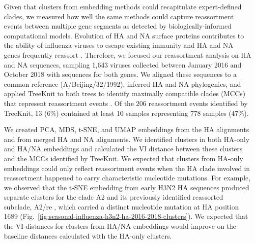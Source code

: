 \documentclass[10pt,letterpaper]{article}
\begin{document}
Given that clusters from embedding methods could recapitulate expert-defined clades, we measured how well the same methods could capture reassortment events between multiple gene segments as detected by biologically-informed computational models.
Evolution of HA and NA surface proteins contributes to the ability of influenza viruses to escape existing immunity \cite{Petrova2018} and HA and NA genes frequently reassort \cite{Nelson2008,Marshall2013,Potter2019}.
Therefore, we focused our reassortment analysis on HA and NA sequences, sampling 1,643 viruses collected between January 2016 and October 2018 with sequences for both genes.
We aligned these sequences to a common reference (A/Beijing/32/1992), inferred HA and NA phylogenies, and applied TreeKnit to both trees to identify maximally compatible clades (MCCs) that represent reassortment events \cite{Barrat-Charlaix2022}.
Of the 206 reassortment events identified by TreeKnit, 13 (6\%) contained at least 10 samples representing 778 samples (47\%).

We created PCA, MDS, t-SNE, and UMAP embeddings from the HA alignments and from merged HA and NA alignments.
We identified clusters in both HA-only and HA/NA embeddings and calculated the VI distance between these clusters and the MCCs identified by TreeKnit.
We expected that clusters from HA-only embeddings could only reflect reassortment events when the HA clade involved in reassortment happened to carry characteristic nucleotide mutations.
For example, we observed that the t-SNE embedding from early H3N2 HA sequences produced separate clusters for the clade A2 and its previously identified reassorted subclade, A2/re \cite{Potter2019}, which carried a distinct nucleotide mutation at HA position 1689 (Fig.~\ref{fig:seasonal-influenza-h3n2-ha-2016-2018-clusters}).
We expected that the VI distances for clusters from HA/NA embeddings would improve on the baseline distances calculated with the HA-only clusters.
\end{document}
